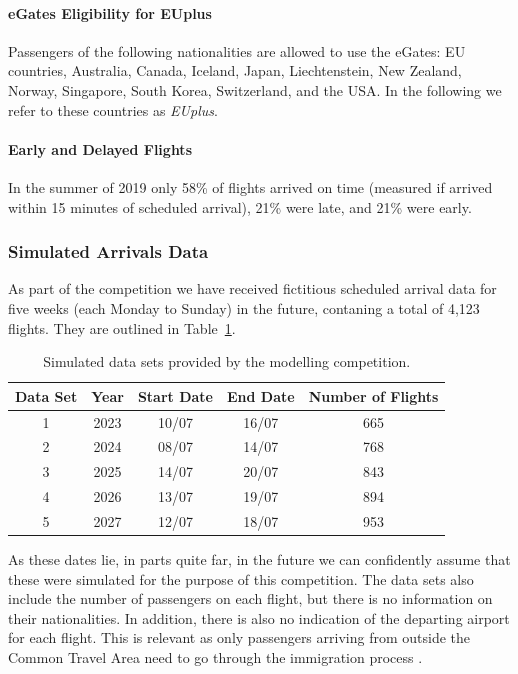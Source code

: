 \documentclass[10pt]{article}
\begin{document}
\paragraph{eGates Eligibility for EUplus}
Passengers of the following nationalities are allowed to use the eGates: EU countries, Australia, Canada, Iceland, Japan, Liechtenstein, New Zealand, Norway, Singapore, South Korea, Switzerland, and the USA. In the following we refer to these countries as \textit{EUplus}. 

\paragraph{Early and Delayed Flights}
In the summer of 2019 only 58\% of flights arrived on time (measured if arrived within 15 minutes of scheduled arrival), 21\% were late, and 21\% were early. 

\subsubsection{Simulated Arrivals Data}
As part of the competition we have received fictitious scheduled arrival data for five weeks (each Monday to Sunday) in the future, contaning a total of 4,123 flights. They are outlined in Table~\ref{tab_comdat_overview}.


\begin{table}[!ht]
\caption{Simulated data sets provided by the modelling competition.}
\label{tab_comdat_overview}
\centering
\begin{tabular}{ccccc}
\hline
\multicolumn{1}{c}{\textbf{Data Set}} & \textbf{Year} & \textbf{Start Date} & \textbf{End Date} & \textbf{Number of Flights} \\ \hline
1  & 2023  & 10/07  & 16/07     & 665   \\
2  & 2024  & 08/07  & 14/07     & 768   \\
3  & 2025  & 14/07  & 20/07     & 843   \\
4  & 2026  & 13/07  & 19/07     & 894   \\
5  & 2027  & 12/07  & 18/07     & 953   \\ \hline
\end{tabular}
\end{table}

As these dates lie, in parts quite far, in the future we can confidently assume that these were simulated for the purpose of this competition. The data sets also include the number of passengers on each flight, but there is no information on their nationalities. In addition, there is also no indication of the departing airport for each flight. This is relevant as only passengers arriving from outside the Common Travel Area need to go through the immigration process \cite{common_travel_area}.
\end{document}
